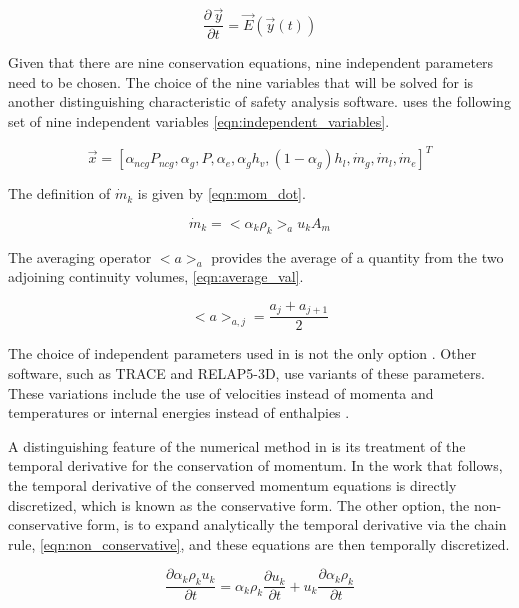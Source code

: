 \begin{equation}
\label{eqn:temporal_semi_discrete}
\frac{\partial \,\vec{y} }{\partial t} = \vec{E}(\vec{y}(t))
\end{equation}

Given that there are nine conservation equations, nine independent parameters need to be chosen.
The choice of the nine variables that will be solved for is another distinguishing characteristic of safety analysis software.
\cobra{} uses the following set of nine independent variables \eqref{eqn:independent_variables}.

\begin{equation}
\label{eqn:independent_variables}
\vec{x} = [\alpha_{ncg}P_{ncg}, \alpha_g, P, \alpha_e, \alpha_g h_v, (1 - \alpha_g) h_l, \dot{m}_g, \dot{m}_l, \dot{m}_e]^{T}
\end{equation}

The definition of $\dot{m}_k$ is given by \eqref{eqn:mom_dot}.

\begin{equation}
\label{eqn:mom_dot}
\dot{m}_{k} = <\alpha_k \rho_k>_{a} u_{k} A_{m}
\end{equation}

The averaging operator $<a>_{a}$ provides the average of a quantity from the two adjoining continuity volumes, \eqref{eqn:average_val}.

\begin{equation}
\label{eqn:average_val}
<a>_{a,j} = \frac{a_{j} + a_{j+1}}{2}
\end{equation}

The choice of independent parameters used in \cobra{} is not the only option .
Other software, such as TRACE and RELAP5-3D, use variants of these parameters.
These variations include the use of velocities instead of momenta and temperatures or internal energies instead of enthalpies \cite{RELAP, TRACE}.

A distinguishing feature of the numerical method in \cobra{} is its treatment of the temporal derivative for the conservation of momentum.
In the work that follows, the temporal derivative of the conserved momentum equations is directly discretized, which is known as the conservative form.
The other option, the non-conservative form, is to expand analytically the temporal derivative via the chain rule, \eqref{eqn:non_conservative}, and these equations are then temporally discretized.

\begin{equation}
\label{eqn:non_conservative}
\frac{\partial \alpha_k \rho_k u_k}{\partial t} = \alpha_k \rho_k \frac{\partial u_k}{\partial t} + u_k \frac{\partial \alpha_k \rho_k}{\partial t}
\end{equation}

